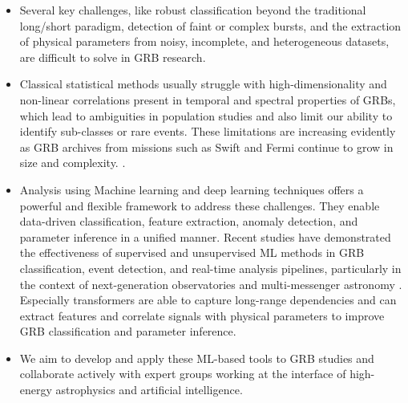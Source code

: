 \begin{itemize}
    \itemsep0em 
    \item Several key challenges, like robust classification beyond the traditional long/short paradigm, detection of faint or complex bursts, and the extraction of physical parameters from noisy, incomplete, and heterogeneous datasets, are difficult to solve in GRB research.
    \item Classical statistical methods usually struggle with high-dimensionality and non-linear correlations present in temporal and spectral properties of GRBs, which lead to ambiguities in population studies and also limit our ability to identify sub-classes or rare events. These limitations are increasing evidently as GRB archives from missions such as Swift and Fermi continue to grow in size and complexity. \cite{Parmiggiani_2021} \cite{Manchanda_2025}.
    
    \item Analysis using Machine learning and deep learning techniques offers a powerful and flexible framework to address these challenges. They enable data-driven classification, feature extraction, anomaly detection, and parameter inference in a unified manner. Recent studies have demonstrated the effectiveness of supervised and unsupervised ML methods in GRB classification, event detection, and real-time analysis pipelines, particularly in the context of next-generation observatories and multi-messenger astronomy \cite{zhang2024advancinggammarayburstidentification} \cite{Baroncelli:2023bgn}. Especially transformers are able to capture long-range dependencies and can extract features and correlate signals with physical parameters to improve GRB classification and parameter inference.
    
    \item We aim to develop and apply these ML-based tools to GRB studies and collaborate actively with expert groups working at the interface of high-energy astrophysics and artificial intelligence.
\end{itemize}

\newpage
\subsubsection*{\fontsize{11.5 pt}{10 pt}\selectfont{GRID Instrumentation : }}


